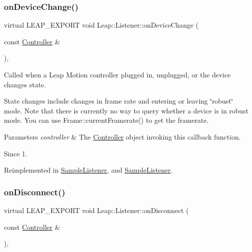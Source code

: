 \subsubsection{\texorpdfstring{on\+Device\+Change()}{onDeviceChange()}}
{\footnotesize\ttfamily virtual L\+E\+A\+P\+\_\+\+E\+X\+P\+O\+RT void Leap\+::\+Listener\+::on\+Device\+Change (\begin{DoxyParamCaption}\item[{const \hyperlink{class_leap_1_1_controller}{Controller} \&}]{ }\end{DoxyParamCaption})\hspace{0.3cm}{\ttfamily [inline]}, {\ttfamily [virtual]}}

Called when a Leap Motion controller plugged in, unplugged, or the device changes state.

State changes include changes in frame rate and entering or leaving \char`\"{}robust\char`\"{} mode. Note that there is currently no way to query whether a device is in robust mode. You can use Frame\+::current\+Framerate() to get the framerate.


\begin{DoxyCodeInclude}
\end{DoxyCodeInclude}



\begin{DoxyParams}{Parameters}
{\em controller} & The \hyperlink{class_leap_1_1_controller}{Controller} object invoking this callback function. \\
\hline
\end{DoxyParams}
\begin{DoxySince}{Since}
1. 
\end{DoxySince}


Reimplemented in \hyperlink{class_sample_listener_a2658fbd2db372f676d9d70665c637af3}{Sample\+Listener}, and \hyperlink{class_sample_listener_a4030bfba07f6a34dabf77459968acd39}{Sample\+Listener}.

\mbox{\label{class_leap_1_1_listener_ac031e2d95b530097e2060518a9190f5e}} 
\subsubsection{\texorpdfstring{on\+Disconnect()}{onDisconnect()}}
{\footnotesize\ttfamily virtual L\+E\+A\+P\+\_\+\+E\+X\+P\+O\+RT void Leap\+::\+Listener\+::on\+Disconnect (\begin{DoxyParamCaption}\item[{const \hyperlink{class_leap_1_1_controller}{Controller} \&}]{ }\end{DoxyParamCaption})\hspace{0.3cm}{\ttfamily [inline]}, {\ttfamily [virtual]}}


